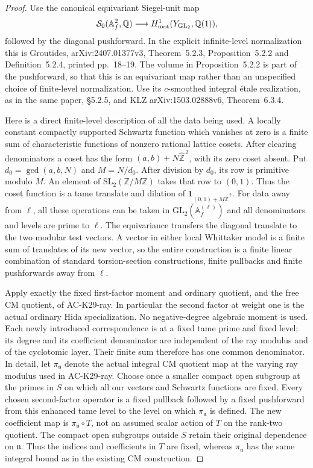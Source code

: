 \begin{proof}
Use the canonical equivariant Siegel-unit map
\[
 \mathcal S_0(\mathbb A_f^2,\mathbb Q)
       \longrightarrow H^1_{\rm mot}(Y_{\mathrm{GL}_2},\mathbb Q(1)),
\]
followed by the diagonal pushforward.  In the explicit
infinite-level normalization this is Groutides,
arXiv:2407.01377v3, Theorem~5.2.3,
Proposition~5.2.2 and Definition~5.2.4, printed pp.~18--19.
The volume in Proposition~5.2.2 is part of the
pushforward, so that this is an equivariant map rather
than an unspecified choice of finite-level normalization.
Use its $c$-smoothed integral étale realization, as in
the same paper, \S5.2.5, and KLZ
arXiv:1503.02888v6, Theorem~6.3.4.

Here is a direct finite-level description of all the data
being used.  A locally constant compactly supported
Schwartz function which vanishes at zero is a finite sum
of characteristic functions of nonzero rational lattice
cosets.  After clearing denominators a coset has the form
$(a,b)+N\widehat{\mathbb Z}^{\,2}$, with its zero coset
absent.  Put $d_0=\gcd(a,b,N)$ and $M=N/d_0$.
After division by $d_0$, its row is primitive modulo $M$.
An element of $\mathrm{SL}_2(\mathbb Z/M\mathbb Z)$ takes
that row to $(0,1)$.  Thus the coset function is a tame
translate and dilation of
$\mathbf1_{(0,1)+M\widehat{\mathbb Z}^{\,2}}$.
For data away from $\ell$, all these operations can be
taken in $\mathrm{GL}_2(\mathbb A_f^{(\ell)})$ and all
denominators and levels are prime to $\ell$.
The equivariance transfers the diagonal translate to the
two modular test vectors.  A vector in either local
Whittaker model is a finite sum of translates of its
new vector, so the entire construction is a finite linear
combination of standard torsion-section constructions,
finite pullbacks and finite pushforwards away from $\ell$.

Apply exactly the fixed first-factor moment and ordinary
quotient, and the free CM quotient, of AC-K29-ray.
In particular the second factor at weight one is the
actual ordinary Hida specialization.  No negative-degree
algebraic moment is used.  Each newly introduced
correspondence is at a fixed tame prime and fixed level;
its degree and its coefficient denominator are independent
of the ray modulus and of the cyclotomic layer.
Their finite sum therefore has one common denominator.
In detail, let $\pi_{\mathfrak n}$ denote the actual
integral CM quotient map at the varying ray modulus
used in AC-K29-ray.  Choose once a smaller compact
open subgroup at the primes in $S$ on which all our
vectors and Schwartz functions are fixed.
Every chosen second-factor operator is a fixed
pullback followed by a fixed pushforward from this
enhanced tame level to the level on which
$\pi_{\mathfrak n}$ is defined.  The new coefficient
map is $\pi_{\mathfrak n}\circ T$, not an assumed
scalar action of $T$ on the rank-two quotient.
The compact open subgroups outside $S$ retain
their original dependence on $\mathfrak n$.
Thus the indices and coefficients in $T$ are fixed,
whereas $\pi_{\mathfrak n}$ has the same integral
bound as in the existing CM construction.


\end{proof}
